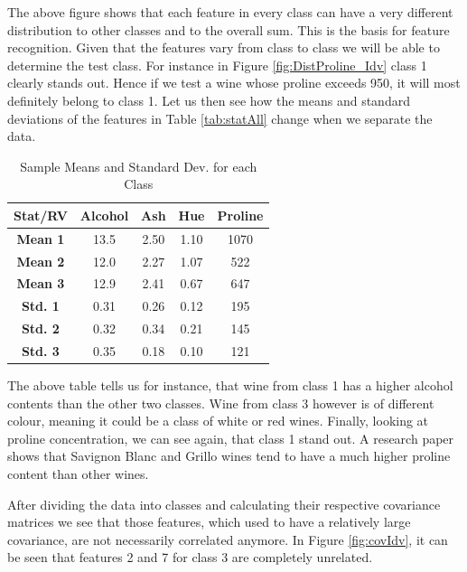 \documentclass[10pt,twocolumn,letterpaper]{article}
\begin{document}
The above figure shows that each feature in every class can have a very different distribution to other classes and to the overall sum. This is the basis for feature recognition. Given that the features vary from class to class we will be able to determine the test class. For instance in Figure \ref{fig:DistProline_Idv} class 1 clearly stands out. Hence if we test a wine whose proline exceeds 950, it will most definitely belong to class 1. Let us then see how the means and standard deviations of the features in Table \ref{tab:statAll} change when we separate the data.

\begin{table}[H]
\caption{Sample Means and Standard Dev. for each Class \label{tab:statCla}}
\small
\begin{center}
\begin{tabular}{|c| c c c c|}
\hline
\bf Stat/RV & Alcohol & Ash & Hue & Proline \\ [0.5ex]
\hline
\bf Mean 1 & 13.5 & 2.50 & 1.10 & 1070 \\ [0.5ex]
\hline
\bf Mean 2 & 12.0 & 2.27 & 1.07 & 522 \\ [0.5ex]
\hline
\bf Mean 3 & 12.9 & 2.41 & 0.67 & 647 \\ [0.5ex]
\hline
\bf Std. 1 & 0.31 & 0.26 & 0.12 & 195 \\ [0.5ex]
\hline
\bf Std. 2 & 0.32 & 0.34 & 0.21 & 145 \\ [0.5ex]
\hline
\bf Std. 3 & 0.35 & 0.18 & 0.10 & 121 \\ [0.5ex]
\hline
\end{tabular}
\end{center}
\end{table}

The above table tells us for instance, that wine from class 1 has a higher alcohol contents than the other two classes. Wine from class 3 however is of different colour, meaning it could be a class of white or red wines. Finally, looking at proline concentration, we can see again, that class 1 stand out. A research paper \cite{wine} shows that Savignon Blanc and Grillo wines tend to have a much higher proline content than other wines.

 
After dividing the data into classes and calculating their respective covariance matrices we see that those features, which used to have a relatively large covariance, are not necessarily correlated anymore. In Figure \ref{fig:covIdv}, it can be seen that features 2 and 7 for class 3 are completely unrelated.
\end{document}
